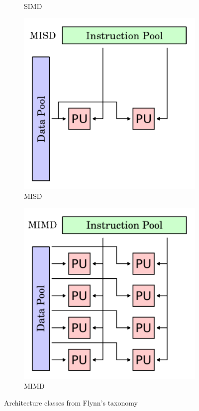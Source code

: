 \documentclass[a4paper, 11pt]{report}
\begin{document}
\begin{figure}[ht]
\begin{subfigure}[t]{0.4\textwidth}
		\caption{SIMD}\label{fig:simd}
	\end{subfigure}
	\begin{subfigure}[t]{0.4\textwidth}
		\centering
		\includegraphics[scale=.3]{images/misd.pdf}
		\caption{MISD}\label{fig:misd}
	\end{subfigure}
	\begin{subfigure}[t]{0.4\textwidth}
		\centering
		\includegraphics[scale=.3]{images/mimd.pdf}
		\caption{MIMD}\label{fig:mimd}
	\end{subfigure}
	\caption{Architecture classes from Flynn's taxonomy}\label{fig:archFlynnTax}
\end{figure}
\end{document}
